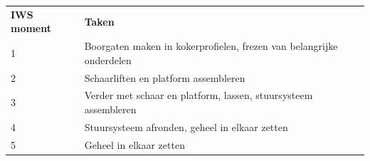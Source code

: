 \begin{table}[H]
\begin{tabular}{| l | l |}
\textbf{IWS moment} & \textbf{Taken}                                                       \\
1                   & Boorgaten maken in kokerprofielen, \newline frezen van belangrijke onderdelen \\
2                   & Schaarliften en platform assembleren                                 \\
3                   & Verder met schaar en platform, lassen, stuursysteem assembleren      \\
4                   & Stuursysteem afronden, geheel in elkaar zetten                       \\
5                   & Geheel in elkaar zetten 
\end{tabular}
\end{table}